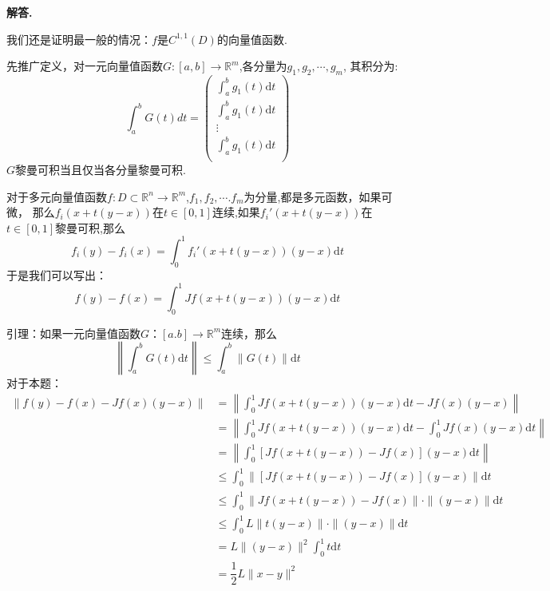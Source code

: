 \documentclass[12pt, a4paper, oneside]{ctexart}
\newenvironment{solution}{\par\noindent\textbf{解答. }}{\par}
\begin{document}
\begin{solution}
    \par
    我们还是证明最一般的情况：$f$是$C^{1,1}(D)$的向量值函数.
    \par
    先推广定义，对一元向量值函数$G: [a,b] \to \mathbb{R}^m$,各分量为$g_1,g_2,\cdots,g_m$,
    其积分为:
    $$
    \int_{a}^{b}G(t)dt =\begin{pmatrix}
        \int_{a}^{b}g_1(t)\mathrm{d}t\\
        \int_{a}^{b}g_1(t)\mathrm{d}t\\
          \vdots\\
        \int_{a}^{b}g_1(t)\mathrm{d}t\\
    \end{pmatrix}
    $$
    $G$黎曼可积当且仅当各分量黎曼可积.
    \par
    对于多元向量值函数$f: D\subset \mathbb{R}^n \to \mathbb{R}^m$,$f_1,f_2,\cdots.f_m$为分量,都是多元函数，如果可微，
    那么$f_i(x+t(y-x))$在$t \in [0,1]$连续,如果$f_i'(x+t(y-x))$在$t\in[0,1]$黎曼可积,那么
    $$
    f_i(y)-f_i(x)=\int_{0}^{1}f_i'(x+t(y-x))(y-x)\mathrm{d}t
    $$
    于是我们可以写出：
    $$
    f(y)-f(x)=\int_{0}^{1}Jf(x+t(y-x))(y-x)\mathrm{d}t
    $$
    \par
    \quad
    \par
    引理：如果一元向量值函数$G：[a.b]\to \mathbb{R}^m$连续，那么
    $$
   \left \|\int_{a}^{b}G(t)\mathrm{d}t\right\|\leqslant \int_{a}^{b}\|G(t)\|\mathrm{d}t
    $$
    对于本题：
    $$
    \begin{aligned}
    \|f(y)-f(x)-Jf(x)(y-x)\|&=\left\|\int_{0}^{1}Jf(x+t(y-x))(y-x)\mathrm{d}t-Jf(x)(y-x)\right\|\\
    &=\left\|\int_{0}^{1}Jf(x+t(y-x))(y-x)\mathrm{d}t-\int_{0}^{1}Jf(x)(y-x)\mathrm{d}t\right\|\\
    &=\left\|\int_{0}^{1}[Jf(x+t(y-x))-Jf(x)](y-x)\mathrm{d}t\right\|\\
    &\leqslant \int_{0}^{1}\|[Jf(x+t(y-x))-Jf(x)](y-x)\|\mathrm{d}t\\
    &\leqslant \int_{0}^{1}\|Jf(x+t(y-x))-Jf(x)\|\cdot\|(y-x)\|\mathrm{d}t\\
    &\leqslant \int_{0}^{1}L\|t(y-x)\|\cdot\|(y-x)\|\mathrm{d}t\\
    &=L\|(y-x)\|^2\int_{0}^{1}t\mathrm{d}t\\
    &=\dfrac{1}{2}L\|x-y\|^2
    \end{aligned}
    $$
\end{solution}
\end{document}
